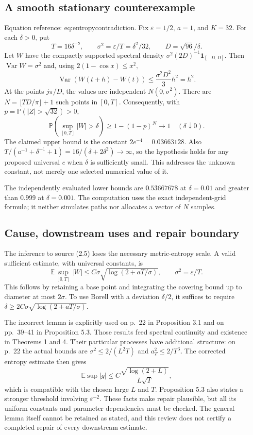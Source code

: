 \documentclass[10pt]{article}
\begin{document}
\subsection*{A smooth stationary counterexample}
Equation reference: eq:entropycontradiction. Fix \(\varepsilon=1/2\), \(a=1\), and \(K=32\). For each \(\delta>0\), put \[T=16\delta^{-2},\qquad \sigma^2=\varepsilon/T=\delta^2/32,\qquad
 D=\sqrt{96}/\delta .\] Let \(W\) have the compactly supported spectral density \(\sigma^2(2D)^{-1}\mathbf 1_{[-D,D]}\). Then \(\operatorname{Var}W=\sigma^2\) and, using \(2(1-\cos x)\le x^2\), \[\operatorname{Var}(W(t+h)-W(t))\le \frac{\sigma^2D^2}{3}h^2=h^2.\] At the points \(j\pi/D\), the values are independent \(N(0,\sigma^2)\). There are \(N=\lfloor TD/\pi\rfloor+1\) such points in \([0,T]\). Consequently, with \(p=\mathbb P(|Z|>\sqrt{32})>0\), \[\mathbb P(\sup_{[0,T]}|W|>\delta)\ge1-(1-p)^N\longrightarrow1
       \quad(\delta\downarrow0).
 \] The claimed upper bound is the constant \(2e^{-4}=0.03663128\). Also \(T/(a^{-1}+\delta^{-1}+1)=16/(\delta+2\delta^2)\to\infty\), so the hypothesis holds for any proposed universal \(c\) when \(\delta\) is sufficiently small. This addresses the unknown constant, not merely one selected numerical value of it.\par
The independently evaluated lower bounds are \(0.53667678\) at \(\delta=0.01\) and greater than \(0.999\) at \(\delta=0.001\). The computation uses the exact independent-grid formula; it neither simulates paths nor allocates a vector of \(N\) samples.\par
\subsection*{Cause, downstream uses and repair boundary}
The inference to source (2.5) loses the necessary metric-entropy scale. A valid sufficient estimate, with universal constants, is \[\mathbb E\sup_{[0,T]}|W|\le
 C\sigma\sqrt{\log(2+aT/\sigma)},\qquad \sigma^2=\varepsilon/T.\] This follows by retaining a base point and integrating the covering bound up to diameter at most \(2\sigma\). To use Borell with a deviation \(\delta/2\), it suffices to require \(\delta\ge2C\sigma\sqrt{\log(2+aT/\sigma)}\).\par
The incorrect lemma is explicitly used on p. 22 in Proposition 3.1 and on pp. 39–41 in Proposition 5.3. Those results feed spectral continuity and existence in Theorems 1 and 4. Their particular processes have additional structure: on p. 22 the actual bounds are \(\sigma^2\le2/(L^2T)\) and \(a_T^2\le2/T^3\). The corrected entropy estimate then gives \[\mathbb E\sup|g|\le
 C\frac{\sqrt{\log(2+L)}}{L\sqrt T},\] which is compatible with the chosen large \(L\) and \(T\). Proposition 5.3 also states a stronger threshold involving \(\varepsilon^{-2}\). These facts make repair plausible, but all its uniform constants and parameter dependencies must be checked. The general lemma itself cannot be retained as stated, and this review does not certify a completed repair of every downstream estimate.\par
\end{document}
